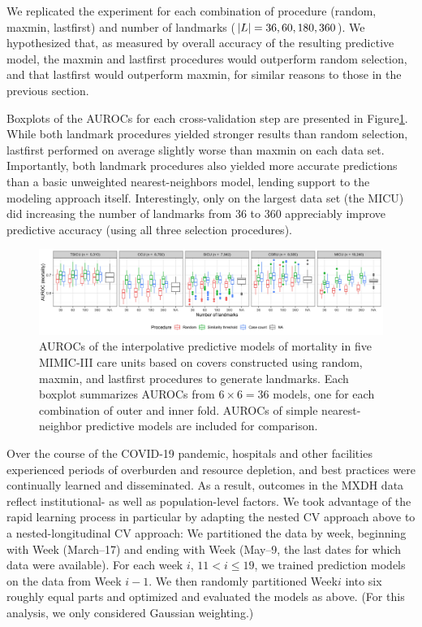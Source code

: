 \documentclass[
]{article}
\begin{document}
We replicated the experiment for each combination of procedure (random,
maxmin, lastfirst) and number of landmarks (\(\lvert L\rvert=36,60,180,360\)).
We hypothesized that, as measured by overall accuracy of the resulting
predictive model, the maxmin and lastfirst procedures would outperform
random selection, and that lastfirst would outperform maxmin, for
similar reasons to those in the previous section.

Boxplots of the AUROCs for each cross-validation step are presented in
Figure\nbs\ref{fig:knn-mimic}. While both landmark procedures yielded
stronger results than random selection, lastfirst performed on average
slightly worse than maxmin on each data set. Importantly, both landmark
procedures also yielded more accurate predictions than a basic
unweighted nearest-neighbors model, lending support to the modeling
approach itself. Interestingly, only on the largest data set (the MICU)
did increasing the number of landmarks from 36 to 360 appreciably
improve predictive accuracy (using all three selection procedures).

\begin{figure}
\includegraphics[width=\textwidth]{../figures/knn-auc}
\caption{
AUROCs of the interpolative predictive models of mortality in five MIMIC-III care units based on covers constructed using random, maxmin, and lastfirst procedures to generate landmarks.
Each boxplot summarizes AUROCs from $6 \times 6 = 36$ models, one for each combination of outer and inner fold.
AUROCs of simple nearest-neighbor predictive models are included for comparison.
\label{fig:knn-mimic}
}
\end{figure}

Over the course of the COVID-19 pandemic, hospitals and other facilities
experienced periods of overburden and resource depletion, and best
practices were continually learned and disseminated. As a result,
outcomes in the MXDH data reflect institutional- as well as
population-level factors. We took advantage of the rapid learning
process in particular by adapting the nested CV approach above to a
nested-longitudinal CV approach: We partitioned the data by week,
beginning with Week (March--17) and ending with Week
(May--9, the last dates for which data were available). For each
week \(i\), \(11 < i \leq 19\), we trained prediction models on the data
from Week \(i-1\). We then randomly partitioned Week\nbs\(i\) into six
roughly equal parts and optimized and evaluated the models as above.
(For this analysis, we only considered Gaussian weighting.)
\end{document}
